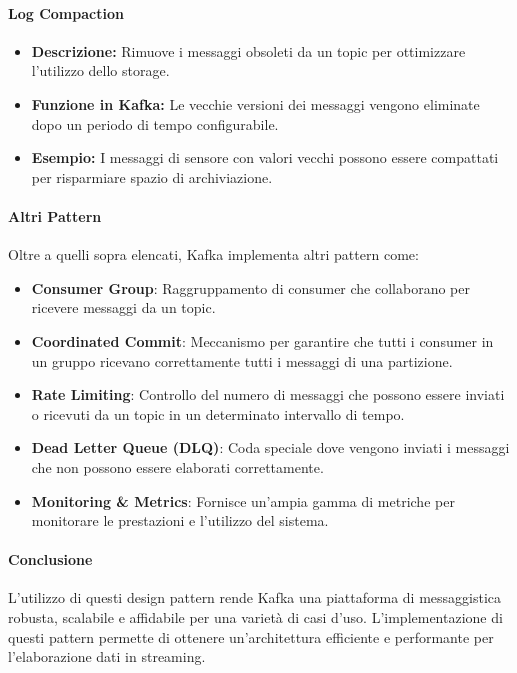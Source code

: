 \paragraph{Log Compaction}
\begin{itemize}
    \item \textbf{Descrizione:} Rimuove i messaggi obsoleti da un topic per ottimizzare l'utilizzo dello storage.
    \item \textbf{Funzione in Kafka:} Le vecchie versioni dei messaggi vengono eliminate dopo un periodo di tempo configurabile.
    \item \textbf{Esempio:} I messaggi di sensore con valori vecchi possono essere compattati per risparmiare spazio di archiviazione.
\end{itemize}

\paragraph{Altri Pattern}
Oltre a quelli sopra elencati, Kafka implementa altri pattern come:
\begin{itemize}
    \item \textbf{Consumer Group}: Raggruppamento di consumer che collaborano per ricevere messaggi da un topic.
    \item \textbf{Coordinated Commit}: Meccanismo per garantire che tutti i consumer in un gruppo ricevano correttamente tutti i messaggi di una partizione.
    \item \textbf{Rate Limiting}: Controllo del numero di messaggi che possono essere inviati o ricevuti da un topic in un determinato intervallo di tempo.
    \item \textbf{Dead Letter Queue (DLQ)}: Coda speciale dove vengono inviati i messaggi che non possono essere elaborati correttamente.
    \item \textbf{Monitoring \& Metrics}: Fornisce un'ampia gamma di metriche per monitorare le prestazioni e l'utilizzo del sistema.
\end{itemize}

\paragraph{Conclusione}
L'utilizzo di questi design pattern rende Kafka una piattaforma di messaggistica robusta, scalabile e affidabile per una varietà di casi d'uso. L'implementazione di questi pattern permette di ottenere un'architettura efficiente e performante per l'elaborazione dati in streaming.